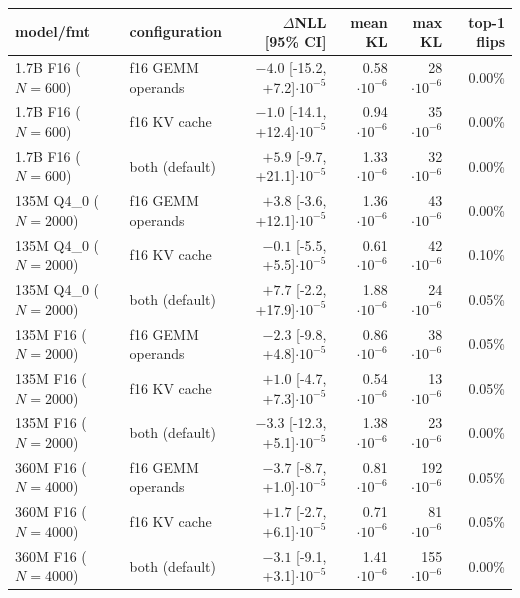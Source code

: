 \begin{tabular}{llrrrr}\toprule
model/fmt & configuration & $\Delta$NLL [95\% CI] & mean KL & max KL & top-1 flips\\\midrule
1.7B F16 ($N{=}600$) & f16 GEMM operands & $-4.0$ [-15.2, +7.2]$\cdot10^{-5}$ & 0.58$\cdot10^{-6}$ & 28$\cdot10^{-6}$ & 0.00\%\\
1.7B F16 ($N{=}600$) & f16 KV cache & $-1.0$ [-14.1, +12.4]$\cdot10^{-5}$ & 0.94$\cdot10^{-6}$ & 35$\cdot10^{-6}$ & 0.00\%\\
1.7B F16 ($N{=}600$) & both (default) & $+5.9$ [-9.7, +21.1]$\cdot10^{-5}$ & 1.33$\cdot10^{-6}$ & 32$\cdot10^{-6}$ & 0.00\%\\
\midrule
135M Q4\_0 ($N{=}2000$) & f16 GEMM operands & $+3.8$ [-3.6, +12.1]$\cdot10^{-5}$ & 1.36$\cdot10^{-6}$ & 43$\cdot10^{-6}$ & 0.00\%\\
135M Q4\_0 ($N{=}2000$) & f16 KV cache & $-0.1$ [-5.5, +5.5]$\cdot10^{-5}$ & 0.61$\cdot10^{-6}$ & 42$\cdot10^{-6}$ & 0.10\%\\
135M Q4\_0 ($N{=}2000$) & both (default) & $+7.7$ [-2.2, +17.9]$\cdot10^{-5}$ & 1.88$\cdot10^{-6}$ & 24$\cdot10^{-6}$ & 0.05\%\\
\midrule
135M F16 ($N{=}2000$) & f16 GEMM operands & $-2.3$ [-9.8, +4.8]$\cdot10^{-5}$ & 0.86$\cdot10^{-6}$ & 38$\cdot10^{-6}$ & 0.05\%\\
135M F16 ($N{=}2000$) & f16 KV cache & $+1.0$ [-4.7, +7.3]$\cdot10^{-5}$ & 0.54$\cdot10^{-6}$ & 13$\cdot10^{-6}$ & 0.05\%\\
135M F16 ($N{=}2000$) & both (default) & $-3.3$ [-12.3, +5.1]$\cdot10^{-5}$ & 1.38$\cdot10^{-6}$ & 23$\cdot10^{-6}$ & 0.00\%\\
\midrule
360M F16 ($N{=}4000$) & f16 GEMM operands & $-3.7$ [-8.7, +1.0]$\cdot10^{-5}$ & 0.81$\cdot10^{-6}$ & 192$\cdot10^{-6}$ & 0.05\%\\
360M F16 ($N{=}4000$) & f16 KV cache & $+1.7$ [-2.7, +6.1]$\cdot10^{-5}$ & 0.71$\cdot10^{-6}$ & 81$\cdot10^{-6}$ & 0.05\%\\
360M F16 ($N{=}4000$) & both (default) & $-3.1$ [-9.1, +3.1]$\cdot10^{-5}$ & 1.41$\cdot10^{-6}$ & 155$\cdot10^{-6}$ & 0.00\%\\
\bottomrule\end{tabular}